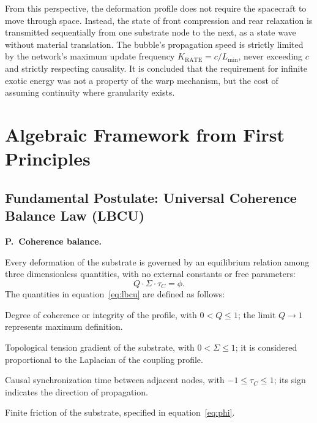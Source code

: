 \documentclass[10pt,a4paper,twocolumn]{article}
\newcounter{parrafoecuacion}
\newcommand{\parrafoecuacion}[2]{%
    \par\smallskip\Needspace{6\baselineskip}%
    \noindent\refstepcounter{parrafoecuacion}\label{#1}%
    \textbf{P\theparrafoecuacion.\ #2.}\enspace
}
\begin{document}
From this perspective, the deformation profile does not require the spacecraft to move through space. Instead, the state of front compression and rear relaxation is transmitted sequentially from one substrate node to the next, as a state wave without material translation. The bubble's propagation speed is strictly limited by the network's maximum update frequency \(K_{\text{RATE}} = c / L_{\text{min}}\), never exceeding \(c\) and strictly respecting causality. It is concluded that the requirement for infinite exotic energy was not a property of the warp mechanism, but the cost of assuming continuity where granularity exists.

\section{Algebraic Framework from First Principles}
\label{sec:marco_lbcu}

\subsection{Fundamental Postulate: Universal Coherence Balance Law (LBCU)}
\parrafoecuacion{par:lbcu}{Coherence balance}
Every deformation of the substrate is governed by an equilibrium relation among three dimensionless quantities, with no external constants or free parameters:
\begin{equation}
    Q \cdot \Sigma \cdot \tau_C = \phi.
    \label{eq:lbcu}
\end{equation}
The quantities in equation~\eqref{eq:lbcu} are defined as follows:
\begin{description}[style=nextline,leftmargin=1em,labelindent=0pt,itemsep=4pt,parsep=0pt]
    \item[$Q$: profile coherence.]
    Degree of coherence or integrity of the profile, with $0 < Q \leq 1$; the limit $Q \to 1$ represents maximum definition.
    \item[$\Sigma$: topological tension.]
    Topological tension gradient of the substrate, with $0 < \Sigma \leq 1$; it is considered proportional to the Laplacian of the coupling profile.
    \item[$\tau_C$: causal time.]
    Causal synchronization time between adjacent nodes, with $-1 \leq \tau_C \leq 1$; its sign indicates the direction of propagation.
    \item[$\phi$: topological friction.]
    Finite friction of the substrate, specified in equation~\eqref{eq:phi}.
\end{description}
\end{document}

